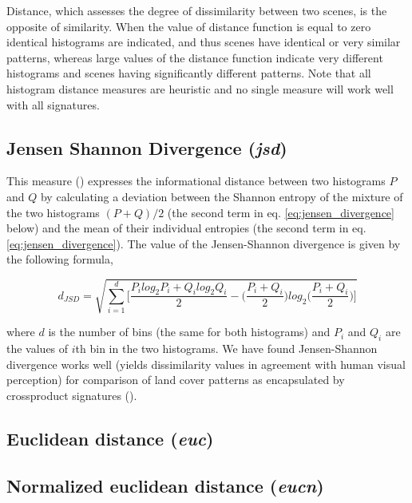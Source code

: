 Distance, which assesses the degree of dissimilarity between two scenes, is the opposite of similarity. 
When the value of distance function is equal to zero identical histograms are indicated, and thus scenes have identical or very similar patterns, whereas large values of the distance function indicate very different histograms and scenes having significantly different patterns. 
Note that all histogram distance measures are heuristic and no single measure will work well with all signatures.

\subsection{Jensen Shannon Divergence ({\it jsd})}

This measure (\cite{Lin1991}) expresses the informational distance between two histograms $P$ and $Q$ by calculating a deviation between the Shannon entropy of the mixture of the two histograms $(P+Q)/2$ (the second term in eq. \ref{eq:jensen_divergence} below) and the mean of their individual entropies (the second term in eq. \ref{eq:jensen_divergence}).
The value of the Jensen-Shannon divergence is given by the following formula,

\begingroup
\scriptsize
\begin{equation} \label{eq:jensen_divergence}
d_{JSD}=\sqrt{\sum\limits_{i=1}^{d}{ 
\biggl[\dfrac{P_{i} log_{2} P_{i}+Q_{i} log_{2} Q_{i}}{2}
-\biggl(\dfrac{P_{i}+Q_{i}}{2} \biggr)log_{2} \biggl(\dfrac{P_{i}+Q_{i}}{2} \biggr)\biggr]}}
\end{equation}
\endgroup

\noindent where $d$ is the number of bins (the same for both histograms) and $P_i$ and $Q_i$ are the values of $i$th bin in the two histograms. 
We have found Jensen-Shannon divergence works well (yields dissimilarity values in agreement with human visual perception) for comparison of land cover patterns as encapsulated by crossproduct signatures (\cite{Jasiewicz2013b,Stepinski2014JSTARS,Netzel2015}).

\subsection{Euclidean distance ({\it euc})}


\subsection{Normalized euclidean distance ({\it eucn})}

